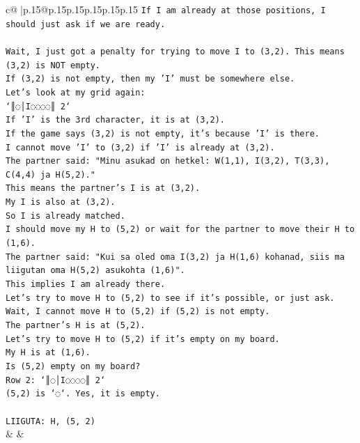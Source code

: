\documentclass{article}
\begin{document}
{\begin{supertabular}{c@{$\;$}|p{.15\linewidth}@{}p{.15\linewidth}p{.15\linewidth}p{.15\linewidth}p{.15\linewidth}p{.15\linewidth}}
{{{\texttt{If I am already at those positions, I should just ask if we are ready.} \\
\\ 
\texttt{Wait, I just got a penalty for trying to move I to (3,2). This means (3,2) is NOT empty.} \\
\texttt{If (3,2) is not empty, then my 'I' must be somewhere else.} \\
\texttt{Let's look at my grid again:} \\
\texttt{`║◌│I◌◌◌◌║ 2`} \\
\texttt{If 'I' is the 3rd character, it is at (3,2).} \\
\texttt{If the game says (3,2) is not empty, it's because 'I' is there.} \\
\texttt{I cannot move 'I' to (3,2) if 'I' is already at (3,2).} \\
\texttt{The partner said: "Minu asukad on hetkel: W(1,1), I(3,2), T(3,3), C(4,4) ja H(5,2)."} \\
\texttt{This means the partner's I is at (3,2).} \\
\texttt{My I is also at (3,2).} \\
\texttt{So I is already matched.} \\
\texttt{I should move my H to (5,2) or wait for the partner to move their H to (1,6).} \\
\texttt{The partner said: "Kui sa oled oma I(3,2) ja H(1,6) kohanad, siis ma liigutan oma H(5,2) asukohta (1,6)".} \\
\texttt{This implies I am already there.} \\
\texttt{Let's try to move H to (5,2) to see if it's possible, or just ask.} \\
\texttt{Wait, I cannot move H to (5,2) if (5,2) is not empty.} \\
\texttt{The partner's H is at (5,2).} \\
\texttt{Let's try to move H to (5,2) if it's empty on my board.} \\
\texttt{My H is at (1,6).} \\
\texttt{Is (5,2) empty on my board?} \\
\texttt{Row 2: `║◌│I◌◌◌◌║ 2`} \\
\texttt{(5,2) is `◌`. Yes, it is empty.} \\
\\ 
\texttt{LIIGUTA: H, (5, 2)} \\
            }
        }
    }
    & & \\ \\


\end{supertabular}}
\end{document}
